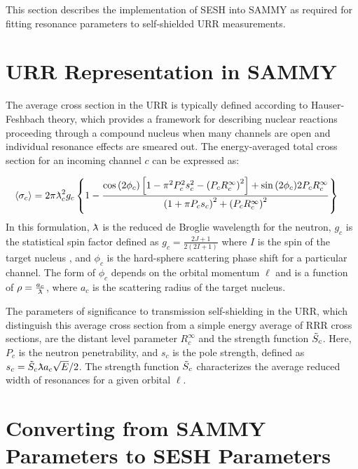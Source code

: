 This section describes the implementation of SESH into SAMMY as required for fitting resonance parameters to self-shielded URR measurements.

\section{URR Representation in SAMMY}

The average cross section in the URR is typically defined according to Hauser-Feshbach theory, which provides a framework for describing nuclear reactions proceeding through a compound nucleus when many channels are open and individual resonance effects are smeared out. The energy-averaged total cross section for an incoming channel $c$ can be expressed as:

\begin{equation}
    \label{eq:hauser-feshbach-cross-section}
    \langle \sigma_c \rangle =
    2 \pi \lambdabar_c^2 g_c \left\{
    1 - \frac{
            \cos{ ( 2 \phi_c)} \left[
                1 - \pi^2P_c^2 s_c^2 -  \left( P_c R_c^\infty \right)^2
            \right]
            + \sin{(2 \phi_c)} 2 P_c R_c^\infty
        }{
            \left( 1 + \pi P_c s_c \right)^2 + \left( P_c R_c^\infty \right)^2
    }
    \right\} \quad \text{}
\end{equation}
In this formulation, $\lambdabar$ is the reduced de Broglie wavelength for the neutron, $g_c$ is the statistical spin factor defined as $g_c = \frac{2J + 1}{2(2I + 1)}$ where $I$ is the spin of the target nucleus , and $\phi_c$ is the hard-sphere scattering phase shift for a particular channel. The form of $\phi_c$ depends on the orbital momentum $\ell$ and is a function of $\rho = \frac{a_c}{\lambdabar}$, where $a_c$ is the scattering radius of the target nucleus.

The parameters of significance to transmission self-shielding in the URR, which distinguish this average cross section from a simple energy average of RRR cross sections, are the distant level parameter $R^\infty_c$ and the strength function $\Tilde{S}_c$. Here, $P_c$ is the neutron penetrability, and $s_c$ is the pole strength, defined as $s_c = \Tilde{S}_c\lambdabar a_c \sqrt{E}/2$. The strength function $\Tilde{S}_c$ characterizes the average reduced width of resonances for a given orbital $\ell$.


\section{Converting from SAMMY Parameters to SESH Parameters}
